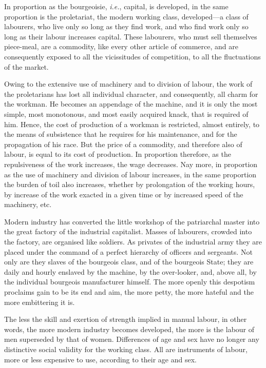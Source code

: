 In proportion as the bourgeoisie, \textit{i.e.}, capital, is developed, in the
same proportion is the proletariat, the modern working class,
developed—a class of labourers, who live only so long as they find
work, and who find work only so long as their labour increases capital.
These labourers, who must sell themselves piece-meal, are a commodity,
like every other article of commerce, and are consequently exposed to
all the vicissitudes of competition, to all the fluctuations of the
market.

Owing to the extensive use of machinery and to division of labour, the
work of the proletarians has lost all individual character, and
consequently, all charm for the workman. He becomes an appendage of the
machine, and it is only the most simple, most monotonous, and most
easily acquired knack, that is required of him. Hence, the cost of
production of a workman is restricted, almost entirely, to the means of
subsistence that he requires for his maintenance, and for the
propagation of his race. But the price of a commodity, and therefore
also of labour, is equal to its cost of production. In proportion
therefore, as the repulsiveness of the work increases, the wage
decreases. Nay more, in proportion as the use of machinery and division
of labour increases, in the same proportion the burden of toil also
increases, whether by prolongation of the working hours, by increase of
the work exacted in a given time or by increased speed of the
machinery, etc.

Modern industry has converted the little workshop of the patriarchal
master into the great factory of the industrial capitalist. Masses of
labourers, crowded into the factory, are organised like soldiers. As
privates of the industrial army they are placed under the command of a
perfect hierarchy of officers and sergeants. Not only are they slaves
of the bourgeois class, and of the bourgeois State; they are daily and
hourly enslaved by the machine, by the over-looker, and, above all, by
the individual bourgeois manufacturer himself. The more openly this
despotism proclaims gain to be its end and aim, the more petty, the
more hateful and the more embittering it is.

The less the skill and exertion of strength implied in manual labour,
in other words, the more modern industry becomes developed, the more is
the labour of men superseded by that of women. Differences of age and
sex have no longer any distinctive social validity for the working
class. All are instruments of labour, more or less expensive to use,
according to their age and sex.

